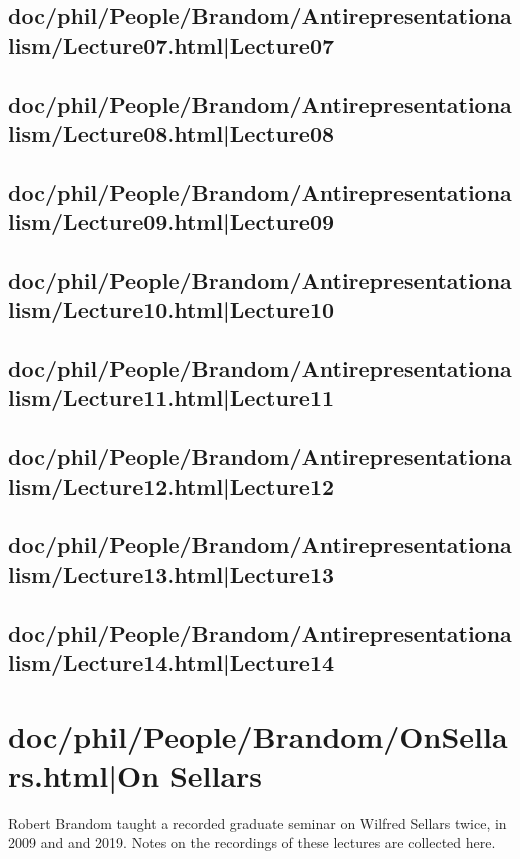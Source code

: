 \documentclass[12pt,a4paper]{report}
\begin{document}
\subsection{doc/phil/People/Brandom/Antirepresentationalism/Lecture07.html|Lecture07}

\subsection{doc/phil/People/Brandom/Antirepresentationalism/Lecture08.html|Lecture08}

\subsection{doc/phil/People/Brandom/Antirepresentationalism/Lecture09.html|Lecture09}

\subsection{doc/phil/People/Brandom/Antirepresentationalism/Lecture10.html|Lecture10}

\subsection{doc/phil/People/Brandom/Antirepresentationalism/Lecture11.html|Lecture11}

\subsection{doc/phil/People/Brandom/Antirepresentationalism/Lecture12.html|Lecture12}

\subsection{doc/phil/People/Brandom/Antirepresentationalism/Lecture13.html|Lecture13}

\subsection{doc/phil/People/Brandom/Antirepresentationalism/Lecture14.html|Lecture14}

\section{doc/phil/People/Brandom/OnSellars.html|On Sellars}
Robert Brandom taught a recorded graduate seminar on Wilfred Sellars twice, in 2009 and and 2019. Notes on the recordings of these lectures are collected here.
\end{document}
